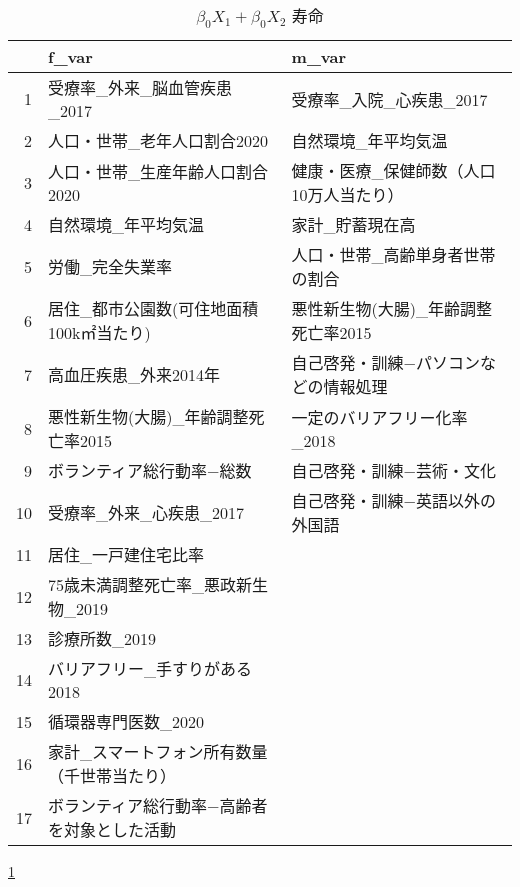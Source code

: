 \documentclass{book}
\begin{document}


\begin{table}[ht]
\centering
\begingroup\tiny
\begin{tabular}{rll}
  \hline
 & f\_var & m\_var \\ 
  \hline
1 & 受療率\_外来\_脳血管疾患\_2017 & 受療率\_入院\_心疾患\_2017 \\ 
  2 & 人口・世帯\_老年人口割合2020 & 自然環境\_年平均気温 \\ 
  3 & 人口・世帯\_生産年齢人口割合2020 & 健康・医療\_保健師数（人口10万人当たり） \\ 
  4 & 自然環境\_年平均気温 & 家計\_貯蓄現在高 \\ 
  5 & 労働\_完全失業率 & 人口・世帯\_高齢単身者世帯の割合 \\ 
  6 & 居住\_都市公園数(可住地面積100k㎡当たり) & 悪性新生物(大腸)\_年齢調整死亡率2015 \\ 
  7 & 高血圧疾患\_外来2014年 & 自己啓発・訓練−パソコンなどの情報処理 \\ 
  8 & 悪性新生物(大腸)\_年齢調整死亡率2015 & 一定のバリアフリー化率\_2018 \\ 
  9 & ボランティア総行動率−総数 & 自己啓発・訓練−芸術・文化 \\ 
  10 & 受療率\_外来\_心疾患\_2017 & 自己啓発・訓練−英語以外の外国語 \\ 
  11 & 居住\_一戸建住宅比率 &  \\ 
  12 & 75歳未満調整死亡率\_悪政新生物\_2019 &  \\ 
  13 & 診療所数\_2019 &  \\ 
  14 & バリアフリー\_手すりがある2018 &  \\ 
  15 & 循環器専門医数\_2020 &  \\ 
  16 & 家計\_スマートフォン所有数量（千世帯当たり） &  \\ 
  17 & ボランティア総行動率−高齢者を対象とした活動 &  \\ 
   \hline
\end{tabular}
\endgroup
\caption[bbb]{$\beta_0
  X_1+
  \beta_0 X_2$
  寿命} 
\label{tablelabel}
\end{table}



\ref{tablelabel}
\end{document}
